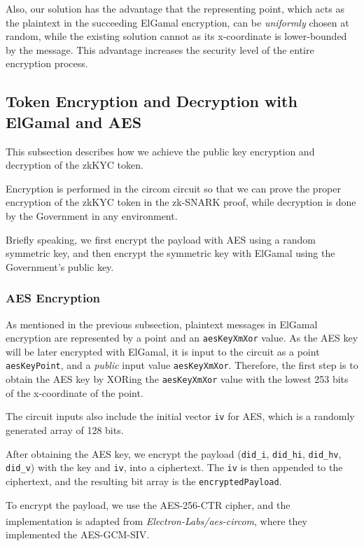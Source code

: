 \documentclass[
]{report}
\begin{document}
Also, our solution has the advantage that the representing point, which
acts as the plaintext in the succeeding ElGamal encryption, can be
\emph{uniformly} chosen at random, while the existing solution cannot as
its x-coordinate is lower-bounded by the message. This advantage
increases the security level of the entire encryption process.

\subsection{Token Encryption and Decryption with ElGamal and AES}

This subsection describes how we achieve the public key encryption and
decryption of the zkKYC token.

Encryption is performed in the circom circuit so that we can prove the
proper encryption of the zkKYC token in the zk-SNARK proof, while
decryption is done by the Government in any environment.

Briefly speaking, we first encrypt the payload with AES using a random
symmetric key, and then encrypt the symmetric key with ElGamal using the
Government's public key.

\subsubsection{AES Encryption}

As mentioned in the previous subsection, plaintext messages in ElGamal
encryption are represented by a point and an \texttt{aesKeyXmXor} value.
As the AES key will be later encrypted with ElGamal, it is input to the
circuit as a point \texttt{aesKeyPoint}, and a \emph{public} input value
\texttt{aesKeyXmXor}. Therefore, the first step is to obtain the AES key
by XORing the \texttt{aesKeyXmXor} value with the lowest 253 bits of the
x-coordinate of the point.

The circuit inputs also include the initial vector \texttt{iv} for AES,
which is a randomly generated array of 128 bits.

After obtaining the AES key, we encrypt the payload (\texttt{did\_i},
\texttt{did\_hi}, \texttt{did\_hv}, \texttt{did\_v}) with the key and
\texttt{iv}, into a ciphertext. The \texttt{iv} is then appended to the
ciphertext, and the resulting bit array is the
\texttt{encryptedPayload}.

To encrypt the payload, we use the AES-256-CTR cipher, and the
implementation is adapted from
\emph{Electron-Labs/aes-circom}\textsuperscript{\cite{aes-circom}},
where they implemented the AES-GCM-SIV.
\end{document}
